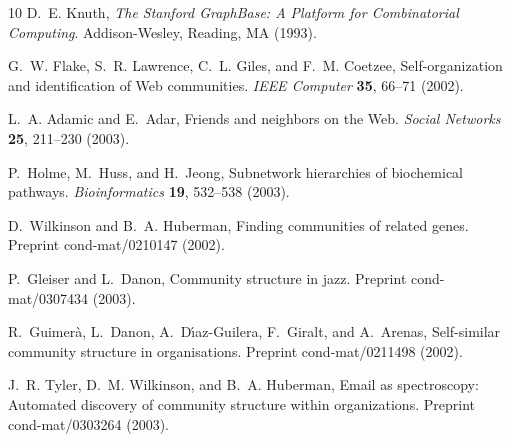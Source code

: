 \documentclass[twocolumn,pre,superscriptaddress]{revtex4}
\begin{document}
\begin{thebibliography}{10}
D.~E. Knuth, \textit{The Stanford GraphBase: A Platform for Combinatorial
  Computing}. Addison-Wesley, Reading, MA (1993).

G.~W. Flake, S.~R. Lawrence, C.~L. Giles, and F.~M. Coetzee, Self-organization
  and identification of {W}eb communities. \textit{IEEE Computer} \textbf{35},
  66--71 (2002).

L.~A. Adamic and E.~Adar, Friends and neighbors on the {W}eb. \textit{Social
  Networks} \textbf{25}, 211--230 (2003).

P.~Holme, M.~Huss, and H.~Jeong, Subnetwork hierarchies of biochemical
  pathways. \textit{Bioinformatics} \textbf{19}, 532--538 (2003).

D.~Wilkinson and B.~A. Huberman, Finding communities of related genes. Preprint
  cond-mat/0210147 (2002).

P.~Gleiser and L.~Danon, Community structure in jazz. Preprint cond-mat/0307434
  (2003).

R.~Guimer\`a, L.~Danon, A.~D{\'\i}az-Guilera, F.~Giralt, and A.~Arenas,
  Self-similar community structure in organisations. Preprint cond-mat/0211498
  (2002).

J.~R. Tyler, D.~M. Wilkinson, and B.~A. Huberman, Email as spectroscopy:
  Automated discovery of community structure within organizations. Preprint
  cond-mat/0303264 (2003).

\end{thebibliography}
\end{document}
